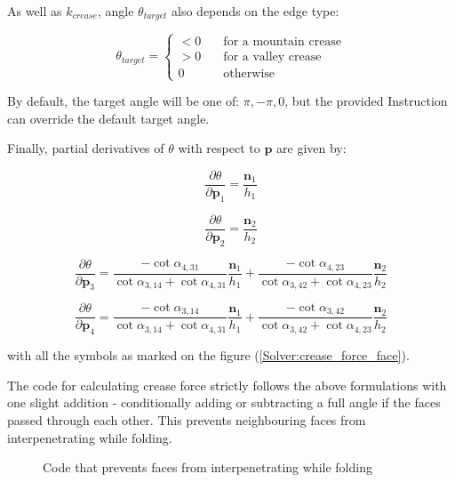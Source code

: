 As well as $k_{crease}$, angle $\theta _{target}$ also depends on the edge type:

$$
\theta _{target} =
\begin{cases}
	< 0 & \quad \text{for a mountain crease}\\
	> 0 & \quad \text{for a valley crease}\\
	0 & \quad \text{otherwise}
\end{cases}
$$

By default, the target angle will be one of: $\pi, -\pi, 0$, but the provided Instruction can override the default target angle.
\smallskip

Finally, partial derivatives of $\theta$ with respect to $\pmb{p}$ are given by:

\begin{equation} \label{Solver:crease_force1}
\frac{\partial \theta}{\partial \pmb{p}_1} = \frac{\pmb{n}_1}{h_1}
\end{equation}

\begin{equation} \label{Solver:crease_force2}
\frac{\partial \theta}{\partial \pmb{p}_2} = \frac{\pmb{n}_2}{h_2}
\end{equation}

\begin{equation} \label{Solver:crease_force3}
	\frac{\partial \theta}{\partial \pmb{p}_3} = \frac{-\cot{\alpha _{4,31}}}{\cot{\alpha _{3,14}} + \cot{\alpha _{4,31}}} \frac{\pmb{n}_1}{h_1} + \frac{-\cot{\alpha _{4,23}}}{\cot{\alpha _{3,42}} + \cot{\alpha _{4,23}}} \frac{\pmb{n}_2}{h_2} 
\end{equation}

\begin{equation} \label{Solver:crease_force4}
\frac{\partial \theta}{\partial \pmb{p}_4} = \frac{-\cot{\alpha _{3,14}}}{\cot{\alpha _{3,14}} + \cot{\alpha _{4,31}}} \frac{\pmb{n}_1}{h_1} + \frac{-\cot{\alpha _{3,42}}}{\cot{\alpha _{3,42}} + \cot{\alpha _{4,23}}} \frac{\pmb{n}_2}{h_2} 
\end{equation}

with all the symbols as marked on the figure (\ref{Solver:crease_force_face}).
\smallskip

The code for calculating crease force strictly follows the above formulations with one slight
addition - conditionally adding or subtracting a full angle if the faces passed through each other.
This prevents neighbouring faces from interpenetrating while folding.

\begin{figure}[H]
	\caption{Code that prevents faces from interpenetrating while folding}
	
\end{figure}

